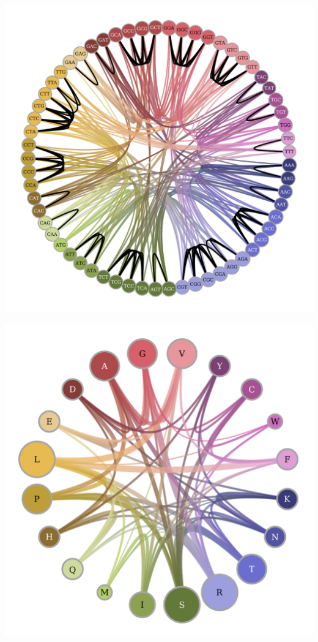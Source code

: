 \begin{center}
	\begin{minipage}{0.48\linewidth}
		\includegraphics[width=\linewidth]{figures/gt-codon-tab20b.pdf}
	\end{minipage}%
	\hfill
	\begin{minipage}{0.49\linewidth}
		\includegraphics[width=\linewidth]{figures/gt-aa-tab20b.pdf}

\end{minipage}
\end{center}
